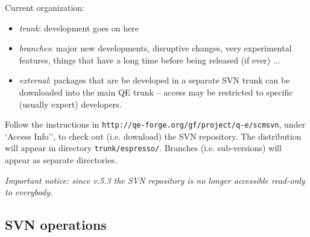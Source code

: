 \documentclass[12pt,a4paper]{article}
\begin{document}
Current organization:
\begin{itemize}
\item {\em trunk}: development goes on here
\item {\em branches}: major new developments, disruptive changes, very
experimental features, things that have a long time before being released
(if ever) ...
\item {\em external}: packages that are be developed in a separate SVN trunk
can be downloaded into the main QE trunk -- access may be restricted to
specific (usually expert) developers.
\end{itemize}

Follow the instructions in
\texttt{http://qe-forge.org/gf/project/q-e/scmsvn},
under `Access Info'',
to check out (i.e.  download) the SVN repository.
The distribution will appear in directory \texttt{trunk/espresso/}.
Branches (i.e. sub-versions) will appear as separate directories.

{\em Important notice: since v.5.3 the SVN repository is no longer accessible
read-only to everybody.}

\subsection{SVN operations}
\end{document}
